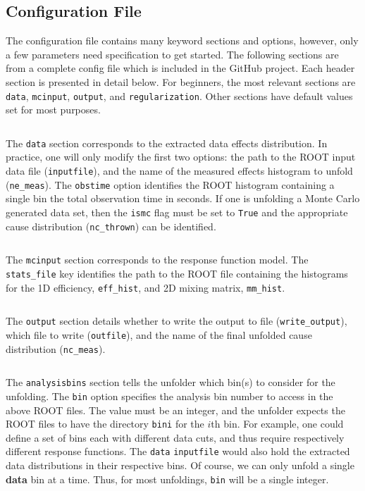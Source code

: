 
\subsection{Configuration File}

The configuration file contains many keyword sections and options, however, only a few parameters need specification to get started.
The following sections are from a complete config file which is included in the GitHub project. 
Each header section is presented in detail below.
For beginners, the most relevant sections are \verb|data|, \verb|mcinput|, \verb|output|, and \verb|regularization|.
Other sections have default values set for most purposes.

\newpage
\noindent\hrulefill

\inputminted[firstline=5,lastline=11]{ini}{code/unfoldConfig.cfg}
The \verb|data| section corresponds to the extracted data effects distribution.
In practice, one will only modify the first two options:
the path to the ROOT input data file (\verb|inputfile|), and the name of the measured effects histogram to unfold (\verb|ne_meas|).
The \verb|obstime| option identifies the ROOT histogram containing a single bin the total observation time in seconds.
If one is unfolding a Monte Carlo generated data set, then the \verb|ismc| flag must be set to \verb|True| and the appropriate cause distribution (\verb|nc_thrown|)
can be identified.

\noindent\hrulefill

\inputminted[firstline=13,lastline=17]{ini}{code/unfoldConfig.cfg}
The \verb|mcinput| section corresponds to the response function model. 
The \verb|stats_file| key identifies the path to the ROOT file containing the histograms for the 1D efficiency, \verb|eff_hist|, and 2D mixing matrix, \verb|mm_hist|.


\noindent\hrulefill

\inputminted[firstline=19,lastline=22]{ini}{code/unfoldConfig.cfg}
The \verb|output| section details whether to write the output to file (\verb|write_output|), which file to write (\verb|outfile|), and the name
of the final unfolded cause distribution (\verb|nc_meas|).

\noindent\hrulefill

\inputminted[firstline=1,lastline=3]{ini}{code/unfoldConfig.cfg}
The \verb|analysisbins| section tells the unfolder which bin(s) to consider for the unfolding. 
The \verb|bin| option specifies the analysis bin number to access in the above ROOT files.
The value must be an integer, and the unfolder expects the ROOT files to have the directory \verb|bini| for the $i$th bin.
For example, one could define a set of bins each with different data cuts, and thus require respectively different response functions.
The \verb|data| \verb|inputfile| would also hold the extracted data distributions in their respective bins.
Of course, we can only unfold a single {\bf data} bin at a time. Thus, for most unfoldings, \verb|bin| will be a single integer.


